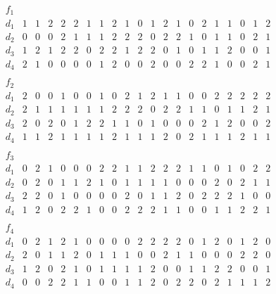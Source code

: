 $$\begin{array}{c|cccccccccccccccccccc} 
f_1 &&&&&&&&&&&&&&&&&&&&\\ 
\hline 
d_1 & 1& 1& 2& 2& 2& 1& 1& 2& 1& 0& 1& 2& 1& 0& 2& 1& 1& 0& 1& 2\\ 
d_2 & 0& 0& 0& 2& 1& 1& 1& 2& 2& 2& 0& 2& 2& 1& 0& 1& 1& 0& 2& 1\\ 
d_3 & 1& 2& 1& 2& 2& 0& 2& 2& 1& 2& 2& 0& 1& 0& 1& 1& 2& 0& 0& 1\\ 
d_4 & 2& 1& 0& 0& 0& 0& 1& 2& 0& 0& 2& 0& 0& 2& 2& 1& 0& 0& 2& 1\\ 
\end{array}$$ 
$$\begin{array}{c|cccccccccccccccccccc} 
f_2 &&&&&&&&&&&&&&&&&&&&\\ 
\hline 
d_1 & 2& 0& 0& 1& 0& 0& 1& 0& 2& 1& 2& 1& 1& 0& 0& 2& 2& 2& 2& 2\\ 
d_2 & 2& 1& 1& 1& 1& 1& 1& 2& 2& 2& 0& 2& 2& 1& 1& 0& 1& 1& 2& 1\\ 
d_3 & 2& 0& 2& 0& 1& 2& 2& 1& 1& 0& 1& 0& 0& 0& 2& 1& 2& 0& 0& 2\\ 
d_4 & 1& 1& 2& 1& 1& 1& 1& 2& 1& 1& 1& 2& 0& 2& 1& 1& 1& 2& 1& 1\\ 
\end{array}$$ 
$$\begin{array}{c|cccccccccccccccccccc} 
f_3 &&&&&&&&&&&&&&&&&&&&\\ 
\hline 
d_1 & 0& 2& 1& 0& 0& 0& 2& 2& 1& 1& 2& 2& 2& 1& 1& 0& 1& 0& 2& 2\\ 
d_2 & 0& 2& 0& 1& 1& 2& 1& 0& 1& 1& 1& 1& 0& 0& 0& 2& 0& 2& 1& 1\\ 
d_3 & 2& 2& 0& 1& 0& 0& 0& 0& 2& 0& 1& 1& 2& 0& 2& 2& 2& 1& 0& 0\\ 
d_4 & 1& 2& 0& 2& 2& 1& 0& 0& 2& 2& 2& 1& 1& 0& 0& 1& 1& 2& 2& 1\\ 
\end{array}$$ 
$$\begin{array}{c|cccccccccccccccccccc} 
f_4 &&&&&&&&&&&&&&&&&&&&\\ 
\hline 
d_1 & 0& 2& 1& 2& 1& 0& 0& 0& 0& 2& 2& 2& 2& 0& 1& 2& 0& 1& 2& 0\\ 
d_2 & 2& 0& 1& 1& 2& 0& 1& 1& 1& 0& 0& 2& 1& 1& 0& 0& 0& 2& 2& 0\\ 
d_3 & 1& 2& 0& 2& 1& 0& 1& 1& 1& 1& 2& 0& 0& 1& 1& 2& 2& 0& 0& 1\\ 
d_4 & 0& 0& 2& 2& 1& 1& 0& 0& 1& 1& 2& 0& 2& 2& 0& 2& 1& 1& 1& 2\\ 
\end{array}$$ 
